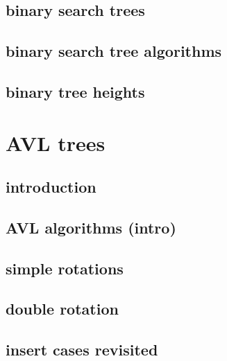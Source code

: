 \subsection{binary search trees}


\subsection{binary search tree algorithms}    
 

\subsection{binary tree heights}


\section{AVL trees}


\subsection{introduction}


\subsection{AVL algorithms (intro)}





\subsection{simple rotations}


\subsection{double rotation}


\subsection{insert cases revisited}


